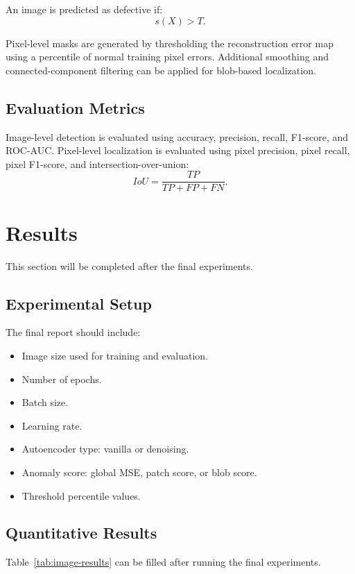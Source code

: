 \documentclass[conference]{IEEEtran}
\begin{document}
An image is predicted as defective if:
\begin{equation}
    s(X) > T.
\end{equation}

Pixel-level masks are generated by thresholding the reconstruction error map using a percentile of normal training pixel errors. Additional smoothing and connected-component filtering can be applied for blob-based localization.

\subsection{Evaluation Metrics}
Image-level detection is evaluated using accuracy, precision, recall, F1-score, and ROC-AUC. Pixel-level localization is evaluated using pixel precision, pixel recall, pixel F1-score, and intersection-over-union:
\begin{equation}
    IoU = \frac{TP}{TP + FP + FN}.
\end{equation}

\section{Results}
This section will be completed after the final experiments.

\subsection{Experimental Setup}
The final report should include:
\begin{itemize}
    \item Image size used for training and evaluation.
    \item Number of epochs.
    \item Batch size.
    \item Learning rate.
    \item Autoencoder type: vanilla or denoising.
    \item Anomaly score: global MSE, patch score, or blob score.
    \item Threshold percentile values.
\end{itemize}

\subsection{Quantitative Results}
Table~\ref{tab:image-results} can be filled after running the final experiments.
\end{document}
